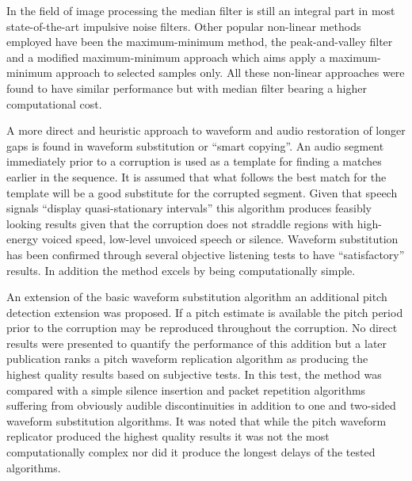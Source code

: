 In the field of image processing the median filter is still an integral part in most state-of-the-art impulsive noise filters\cite{Alajlan2004}. Other popular non-linear methods employed have been the maximum-minimum method\cite{Xu1998}, the peak-and-valley filter\linebreak[2]\cite{Windyga2001} and a modified maximum-minimum approach\cite{Alajlan2004} which aims apply a maximum-minimum approach to selected samples only. All these non-linear approaches were found to have similar performance but with median filter bearing a higher computational cost\cite{Alajlan2004}.

A more direct and heuristic approach to waveform and audio restoration of longer gaps is found in waveform substitution\cite{Goodman1986} or ``smart copying''\cite{Niediwiecki2001}. An audio segment immediately prior to a corruption is used as a template for finding a matches earlier in the sequence. It is assumed that what follows the best match for the template will be a good substitute for the corrupted segment. Given that speech signals ``display quasi-stationary intervals''\cite{Goodman1986} this algorithm produces feasibly looking results given that the corruption does not straddle regions with high-energy voiced speed, low-level unvoiced speech or silence\cite{Goodman1986}. Waveform substitution has been confirmed through several objective listening tests to have ``satisfactory'' results\cite{Niediwiecki2001}. In addition the method excels by being computationally simple\cite{Niediwiecki2001}.

An extension of the basic waveform substitution algorithm an additional pitch detection extension was proposed. If a pitch estimate is available the pitch period prior to the corruption may be reproduced throughout the corruption\cite{Goodman1986}. No direct results were presented to quantify the performance of this addition but a later publication ranks a pitch waveform replication algorithm as producing the highest quality results based on subjective tests\cite{Wasem1988}. In this test, the method was compared with a simple silence insertion and packet repetition algorithms suffering from obviously audible discontinuities\cite{Goodman1986} in addition to one and two-sided waveform substitution algorithms\cite{Goodman1986}. It was noted that while the pitch waveform replicator produced the highest quality results it was not the most computationally complex nor did it produce the longest delays of the tested algorithms\cite{Wasem1988}.

